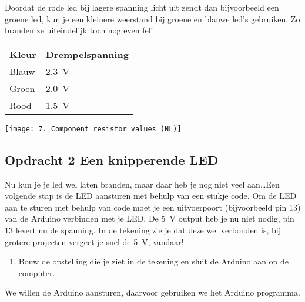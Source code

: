 \documentclass{arduino}
\begin{document}
Doordat de rode led bij lagere spanning licht uit zendt dan bijvoorbeeld een groene led, kun je een kleinere weerstand bij groene en blauwe led’s gebruiken. Zo branden ze uiteindelijk toch nog even fel!

\begin{tabular}{ll}
\textbf{Kleur} & \textbf{Drempelspanning}\\
Blauw & \SI{2.3}{\volt} \\ 
Groen & \SI{2.0}{\volt} \\
Rood  & \SI{1.5}{\volt} \\
\end{tabular}

\begin{minipage}[t]{\linewidth}
\texttt{[image: 7. Component resistor values (NL)]}
\end{minipage}

\newpage
\subsection{Opdracht 2 Een knipperende LED}


Nu kun je je led wel laten branden, maar daar heb je nog niet veel aan\dots Een volgende stap is de LED aansturen met behulp van een stukje code. Om de LED aan te sturen met behulp van code moet je een uitvoerpoort (bijvoorbeeld pin 13) van de Arduino verbinden met je LED. De \SI{5}{\volt} output heb je nu niet nodig, pin 13 levert nu de spanning. In de tekening zie je dat deze wel verbonden is, bij grotere projecten vergeet je snel de \SI{5}{\volt}, vandaar!

\begin{enumerate}[label={\alph*})]
\item Bouw de opstelling die je ziet in de tekening en sluit de Arduino aan op de computer.
\end{enumerate}

We willen de Arduino aansturen, daarvoor gebruiken we het Arduino programma.
\end{document}
